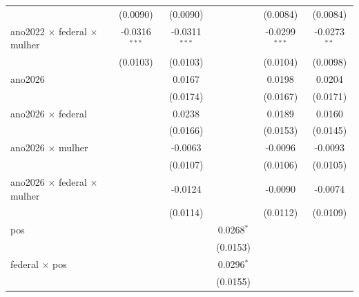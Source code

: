 \begin{tabular}{lccccc}
                                              & (0.0090)              & (0.0090)        &                 & (0.0084)           & (0.0084)\\   
   ano2022 $\times$ federal $\times$ mulher   & -0.0316$^{***}$       & -0.0311$^{***}$ &                 & -0.0299$^{***}$    & -0.0273$^{**}$\\   
                                              & (0.0103)              & (0.0103)        &                 & (0.0104)           & (0.0098)\\   
   ano2026                                    &                       & 0.0167          &                 & 0.0198             & 0.0204\\   
                                              &                       & (0.0174)        &                 & (0.0167)           & (0.0171)\\   
   ano2026 $\times$ federal                   &                       & 0.0238          &                 & 0.0189             & 0.0160\\   
                                              &                       & (0.0166)        &                 & (0.0153)           & (0.0145)\\   
   ano2026 $\times$ mulher                    &                       & -0.0063         &                 & -0.0096            & -0.0093\\   
                                              &                       & (0.0107)        &                 & (0.0106)           & (0.0105)\\   
   ano2026 $\times$ federal $\times$ mulher   &                       & -0.0124         &                 & -0.0090            & -0.0074\\   
                                              &                       & (0.0114)        &                 & (0.0112)           & (0.0109)\\   
   pos                                        &                       &                 & 0.0268$^{*}$    &                    &   \\   
                                              &                       &                 & (0.0153)        &                    &   \\   
   federal $\times$ pos                       &                       &                 & 0.0296$^{*}$    &                    &   \\   
                                              &                       &                 & (0.0155)        &                    &   \\   

\end{tabular}
